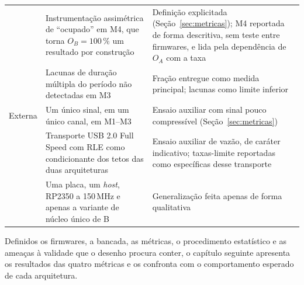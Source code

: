 {\begin{xltabular}{\linewidth}{|>{\raggedright\arraybackslash}p{2.0cm}|>{\raggedright\arraybackslash}X|>{\raggedright\arraybackslash}X|}
                       & Instrumentação assimétrica de ``ocupado'' em M4, que torna $O_B = 100\,\%$ um resultado por construção
                       & Definição explicitada (Seção~\ref{sec:metricas}); M4 reportada de forma descritiva, sem teste entre firmwares, e lida pela dependência de $O_A$ com a taxa \\ 
                       & Lacunas de duração múltipla do período não detectadas em M3
                       & Fração entregue como medida principal; lacunas como limite inferior                                                     \\ \hline
    Externa            & Um único sinal, em um único canal, em M1--M3
                       & Ensaio auxiliar com sinal pouco compressível (Seção~\ref{sec:metricas})                                                 \\ 
                       & Transporte \acs{USB} 2.0 Full Speed com \acs{RLE} como condicionante dos tetos das duas arquiteturas
                       & Ensaio auxiliar de vazão, de caráter indicativo; taxas-limite reportadas como específicas desse transporte \\ 
                       & Uma placa, um \emph{host}, RP2350 a 150\,MHz e apenas a variante de núcleo único de B
                       & Generalização feita apenas de forma qualitativa                                                                         \\ \hline
\end{xltabular}
}
\medskip

Definidos os firmwares, a bancada, as métricas, o procedimento estatístico e
as ameaças à validade que o desenho procura conter, o capítulo seguinte
apresenta os resultados das quatro métricas e os confronta com o
comportamento esperado de cada arquitetura.
